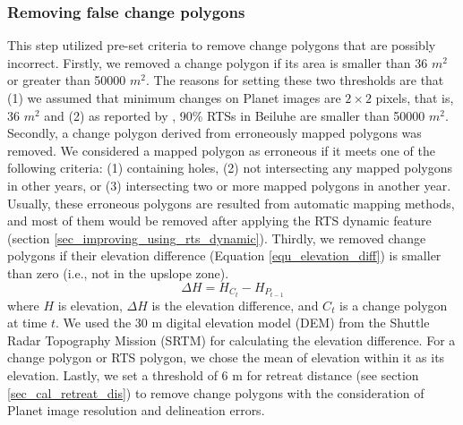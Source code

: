\documentclass[authoryear,preprint,review,12pt]{elsarticle}
\begin{document}
\subsubsection{Removing false change polygons}
\label{sec_removing_false_change}

This step utilized pre-set criteria to remove change polygons that are possibly incorrect. 
Firstly, we removed a change polygon if its area is smaller than 36 $m^2$ or greater than 50000 $m^2$. 
The reasons for setting these two thresholds are that (1) we assumed that minimum changes on Planet images are $2\times2$ pixels, that is, 36 $m^2$ and (2) as reported by \cite{huang2020using}, 90\% RTSs in Beiluhe are smaller than 50000 $m^2$. 
Secondly, a change polygon derived from erroneously mapped polygons was removed.
We considered a mapped polygon as erroneous if it meets one of the following criteria: (1) containing holes, (2) not intersecting any mapped polygons in other years, or (3) intersecting two or more mapped polygons in another year.
Usually, these erroneous polygons are resulted from automatic mapping methods, and most of them would be removed after applying the RTS dynamic feature (section \ref{sec_improving_using_rts_dynamic}). 
Thirdly, we removed change polygons if their elevation difference (Equation \ref{equ_elevation_diff}) is smaller than zero (i.e., not in the upslope zone). 
\begin{equation}
\Delta H = H_{C_{t}} -  H_{P_{t-1}}
\label{equ_elevation_diff}
\end{equation}
where $H$ is elevation, $\Delta H$ is the elevation difference, and $C_{t}$ is a change polygon at time $t$.
We used the 30 m digital elevation model (DEM) from the Shuttle Radar Topography Mission (SRTM) \citep{farr2007shuttle} for calculating the elevation difference. 
For a change polygon or RTS polygon, we chose the mean of elevation within it as its elevation. 
Lastly, we set a threshold of 6 m for retreat distance (see section \ref{sec_cal_retreat_dis}) to remove change polygons with the consideration of Planet image resolution and delineation errors. 
\end{document}
